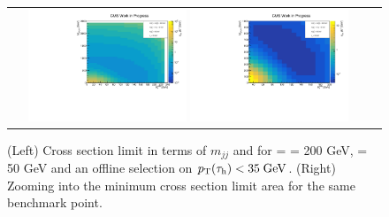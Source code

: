 \begin{figure}[tbh!]
	\centering
	\begin{tabular}{cc}
		\includegraphics[width=0.45\textwidth]{analysis/pics/JetInvMass_vs_MET_xsec_chi200_lsp050_taupt35.pdf}
		\includegraphics[width=0.45\textwidth]{analysis/pics/JetInvMass_vs_MET_xsec_chi200_lsp050_taupt35_zoom.pdf} 		
	\end{tabular}
	\caption{(Left) Cross section limit in terms of $m_{jj}$ and \met for \charginopm = \neutralinotwo = 200 GeV, \neutralinoone = 50 GeV and an offline selection on $p_{\text{T}}(\tau_{\text{h}}) <  35\;\text{Ge}\kern-0.06667em\text{V}$. (Right) Zooming into the minimum cross section limit area for the same benchmark point.}
	\label{fig::JetInvMass_vs_MET_xsec_chi200_lsp050_taupt35}
\end{figure}

